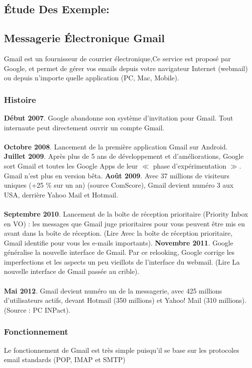 \documentclass[french]{report}
\begin{document}
\begin{titlepage}
\section{\LARGE Étude Des Exemple:}
\subsection{\LARGE Messagerie Électronique Gmail}
\LARGE Gmail est un fournisseur de courrier électronique,Ce service est proposé par Google, et permet de gérer vos emails depuis votre navigateur Internet (webmail) ou depuis n’importe quelle application (PC, Mac, Mobile).
\subsubsection{\LARGE Histoire}
\LARGE
\textbf{Début 2007}. Google abandonne son système d’invitation pour Gmail. Tout internaute peut directement ouvrir un compte Gmail.\\ \\
\textbf{Octobre 2008}. Lancement de la première application Gmail sur Android.
\textbf{Juillet 2009}. Après plus de 5 ans de développement et d’améliorations, Google sort Gmail et toutes les Google Apps de leur $\ll$ phase d’expérimentation $\gg$. Gmail n’est plus en version bêta.
\textbf{Août 2009}. Avec 37 millions de visiteurs uniques (+25 \% sur un an) (source ComScore), Gmail devient numéro 3 aux USA, derrière Yahoo Mail et Hotmail.\\ \\
\textbf{Septembre 2010}. Lancement de la boîte de réception prioritaire (Priority Inbox en VO) : les messages que Gmail juge prioritaires pour vous peuvent être mis en avant dans la boîte de réception. (Lire Avec la boîte de réception prioritaire, Gmail identifie pour vous les e-mails importants).
\textbf{Novembre 2011}. Google généralise la nouvelle interface de Gmail. Par ce relooking, Google corrige les imperfections et les aspects un peu vieillots de l’interface du webmail. (Lire La nouvelle interface de Gmail passée au crible).\\ \\
\textbf{Mai 2012}. Gmail devient numéro un de la messagerie, avec 425 millions d’utilisateurs actifs, devant Hotmail (350 millions) et Yahoo! Mail (310 millions). (Source : PC INPact).
\subsubsection{\LARGE Fonctionnement}
\LARGE Le fonctionnement de Gmail est très simple puisqu’il se base sur les protocoles email standards (POP, IMAP et SMTP)
\newpage

\end{titlepage}
\end{document}
